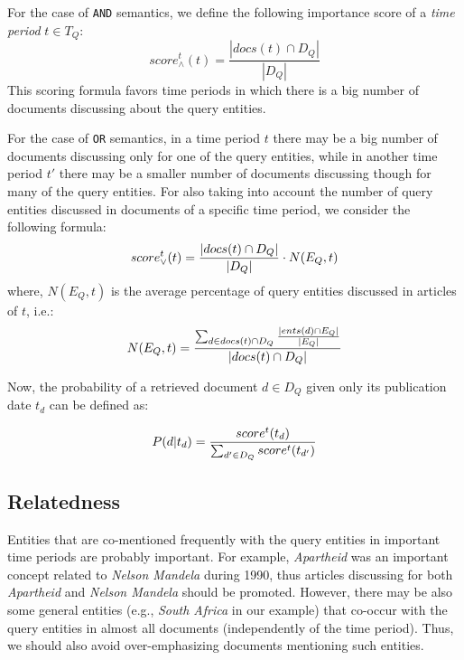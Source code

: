 For the case of {\tt AND} semantics,
we define the following importance score of a {\em time period} $t \in T_Q$:
\begin{equation}
score^{t}_\wedge(t) = \frac{|docs(t) \cap D_Q|}{|D_Q|}
\end{equation}
This scoring formula favors time periods in which there is a big number
of documents discussing about the query entities.

For the case of {\tt OR} semantics,
in a time period $t$ there may be a
big number of documents discussing only for one of the query entities,
while in another time period $t'$ there may be a smaller number
of documents discussing though for many of the query entities.
For also taking into account the number of query entities discussed in documents
of a specific time period, we consider the following formula:
\begin{equation}
\small
score^{t}_\vee(t) = \frac{|docs(t) \cap D_Q|}{|D_Q|} \cdot N(E_Q,t)
\end{equation}
where, $N(E_Q,t)$ is the average percentage of query entities discussed in articles of $t$, i.e.:
\begin{equation}
\small
N(E_Q,t) =  \frac{\sum_{d \in docs(t) \cap D_Q}{\frac{|ents(d) \cap E_Q|}{|E_Q|}}}{|docs(t) \cap D_Q|}
\end{equation}

Now, the probability of a retrieved document $d \in D_Q$ given only its publication date $t_d$ can be defined as:

\begin{equation}
\small
P(d | t_d) = \frac{score^{t}(t_d)}{\sum_{d' \in D_Q}{score^{t}(t_{d'})}}
\end{equation}



\subsection*{Relatedness}

Entities that are co-mentioned frequently with the query entities
in important time periods are probably important.
For example, {\em Apartheid} was an important concept
related to {\em Nelson Mandela} %
during 1990,
thus articles discussing for both {\em Apartheid} and {\em Nelson Mandela} %
should be promoted.
However, there may be also some general entities (e.g., {\em South Africa} in our example)
that co-occur with the query entities in almost all documents (independently of the time period).
Thus, we should also avoid over-emphasizing documents mentioning such  entities.

